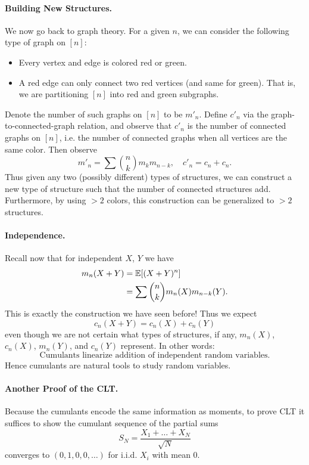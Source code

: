 \paragraph{Building New Structures.} We now go back to graph theory. For a given $n$, we can consider the following type of graph on $[n]$:
\begin{itemize}
    \item Every vertex and edge is colored red or green.
    \item A red edge can only connect two red vertices (and same for green). That is, we are partitioning $[n]$ into red and green subgraphs.
\end{itemize}
Denote the number of such graphs on $[n]$ to be $m'_n$. Define $c'_n$ via the graph-to-connected-graph relation, and observe that $c'_n$ is the number of connected graphs on $[n]$, i.e. the number of connected graphs when all vertices are the same color. Then observe
\[
    m'_n = \sum \binom{n}{k}m_km_{n-k}, \quad c'_n = c_n + c_n.
\]
Thus given any two (possibly different) types of structures, we can construct a new type of structure such that the number of connected structures add. Furthermore, by using $> 2$ colors, this construction can be generalized to $> 2$ structures.

\paragraph{Independence.} Recall now that for independent $X$, $Y$ we have
\[
    \begin{split}
        m_n(X+Y) & = {\mathbb E}[(X+Y)^n] \\
                 & = \sum \binom{n}{k}m_n(X)m_{n-k}(Y).
    \end{split}
\]
This is exactly the construction we have seen before! Thus we expect
\[
    c_n(X + Y) = c_n(X) + c_n(Y)
\]
even though we are not certain what types of structures, if any, $m_n(X)$, $c_n(X)$, $m_n(Y)$, and $c_n(Y)$ represent. In other words:
\[
    \boxed{\text{Cumulants linearize addition of independent random variables.}}
\]
Hence cumulants are natural tools to study random variables.

\paragraph{Another Proof of the CLT.} Because the cumulants encode the same information as moments, to prove CLT it suffices to show the cumulant sequence of the partial sums
\[
    S_N = \frac{X_1 + \dots + X_N}{\sqrt{N}}
\]
converges to $(0, 1, 0, 0, \dots)$ for i.i.d. $X_i$ with mean 0.

